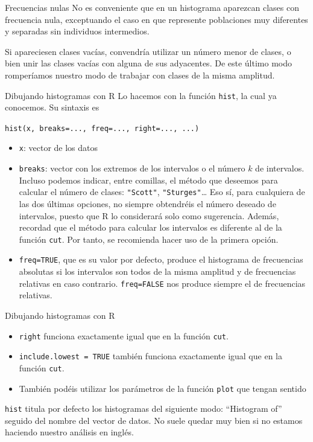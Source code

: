 \documentclass[
  ignorenonframetext,
  aspectratio=169]{beamer}
\providecommand{\tightlist}{%
  \setlength{\itemsep}{0pt}\setlength{\parskip}{0pt}}
\begin{document}
\begin{frame}{Frecuencias nulas}
\protect\hypertarget{frecuencias-nulas}{}
No es conveniente que en un histograma aparezcan clases con frecuencia
nula, exceptuando el caso en que represente poblaciones muy diferentes y
separadas sin individuos intermedios.

Si apareciesen clases vacías, convendría utilizar un número menor de
clases, o bien unir las clases vacías con alguna de sus adyacentes. De
este último modo romperíamos nuestro modo de trabajar con clases de la
misma amplitud.
\end{frame}

\begin{frame}[fragile]{Dibujando histogramas con R}
\protect\hypertarget{dibujando-histogramas-con-r}{}
Lo hacemos con la función \texttt{hist}, la cual ya conocemos. Su
sintaxis es

\texttt{hist(x,\ breaks=...,\ freq=...,\ right=...,\ ...)}

\begin{itemize}
\tightlist
\item
  \texttt{x}: vector de los datos
\item
  \texttt{breaks}: vector con los extremos de los intervalos o el número
  \(k\) de intervalos. Incluso podemos indicar, entre comillas, el
  método que deseemos para calcular el número de clases:
  \texttt{"Scott"}, \texttt{"Sturges"}\ldots{} Eso sí, para cualquiera
  de las dos últimas opciones, no siempre obtendréis el número deseado
  de intervalos, puesto que R lo considerará solo como sugerencia.
  Además, recordad que el método para calcular los intervalos es
  diferente al de la función \texttt{cut}. Por tanto, se recomienda
  hacer uso de la primera opción.
\item
  \texttt{freq=TRUE}, que es su valor por defecto, produce el histograma
  de frecuencias absolutas si los intervalos son todos de la misma
  amplitud y de frecuencias relativas en caso contrario.
  \texttt{freq=FALSE} nos produce siempre el de frecuencias relativas.
\end{itemize}
\end{frame}

\begin{frame}[fragile]{Dibujando histogramas con R}
\protect\hypertarget{dibujando-histogramas-con-r-1}{}
\begin{itemize}
\tightlist
\item
  \texttt{right} funciona exactamente igual que en la función
  \texttt{cut}.
\item
  \texttt{include.lowest\ =\ TRUE} también funciona exactamente igual
  que en la función \texttt{cut}.
\item
  También podéis utilizar los parámetros de la función \texttt{plot} que
  tengan sentido
\end{itemize}

\texttt{hist} titula por defecto los histogramas del siguiente modo:
``Histogram of'' seguido del nombre del vector de datos. No suele quedar
muy bien si no estamos haciendo nuestro análisis en inglés.
\end{frame}
\end{document}
